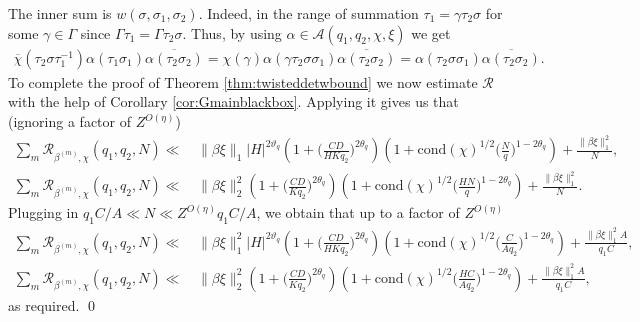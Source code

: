 \documentclass[12pt]{amsart}
\theoremstyle{definition}
\theoremstyle{remark}
\numberwithin{equation}{section}
\newcommand{\1}{{\mathbf 1}}
\begin{document}
The inner sum is $w(\sigma,\sigma_1,\sigma_2)$. Indeed, in the range of summation $  \tau_1 = \gamma \tau_2 \sigma$ for some  $\gamma \in \Gamma$ since $\Gamma \tau_1 = \Gamma \tau_2 \sigma$. Thus, by using $\alpha \in \mathcal{A}(q_1,q_2,\chi,\xi)$ we get
 \begin{align*}
  \overline{\chi}(\tau_2 \sigma \tau_1^{-1}) \alpha(\tau_1  \sigma_1)  \overline{\alpha(\tau_2  \sigma_2)  } =  \chi(\gamma) \alpha( \gamma \tau_2 \sigma  \sigma_1)  \overline{\alpha(\tau_2  \sigma_2)  }  =   \alpha(  \tau_2 \sigma  \sigma_1)  \overline{\alpha(\tau_2  \sigma_2)  }.
 \end{align*}
To complete the proof of Theorem \ref{thm:twisteddetwbound} we now estimate $\mathcal{R}$ with the help of Corollary \ref{cor:Gmainblackbox}. Applying it gives us that  (ignoring  a factor of $ Z^{O(\eta)}$)
\begin{align*}
\sum_m \mathcal{R}_{\beta^{(m)},\chi}(q_1,q_2,N) \ll & \,  \|\beta \xi \|_1|H|^{2\vartheta_q}  \left(1+\bigg(\frac{CD}{ HK q_2 }\bigg)^{2\theta_q} \right)\left(1+ \mathrm{cond}(\chi)^{1/2}\bigg(\frac{N}{q}\bigg)^{1-2\theta_q}\right) + \frac{\|\beta \xi \|_1^2}{ N} ,  \\
   \sum_m \mathcal{R}_{\beta^{(m)},\chi}(q_1,q_2,N) \ll & \,   \|\beta \xi \|_2^2 \left(1+\bigg(\frac{ CD}{ K q_2}\bigg)^{2\theta_q} \right)\left(1+ \mathrm{cond}(\chi)^{1/2}\bigg(\frac{H N}{q}\bigg)^{1-2\theta_q}\right)   +\frac{\|\beta \xi \|_1^2}{ N}.
\end{align*}
Plugging in  $ q_1 C/A \ll N \ll Z^{O(\eta)} q_1 C/A$, we obtain that up to  a factor of $ Z^{O(\eta)}$
\begin{align*}
\sum_m \mathcal{R}_{\beta^{(m)},\chi}(q_1,q_2,N) \ll & \,  \|\beta  \xi \|_1^2|H|^{2\vartheta_q}  \left(1+\bigg(\frac{CD}{ HK q_2 }\bigg)^{2\theta_q} \right)\left(1+ \mathrm{cond}(\chi)^{1/2}\bigg(\frac{C}{A q_2}\bigg)^{1-2\theta_q}\right)  +\frac{ \|\beta  \xi \|_1^2 A }{q_1 C}, \\
   \sum_m \mathcal{R}_{\beta^{(m)},\chi}(q_1,q_2,N)  \ll & \,   \|\beta  \xi  \|_2^2 \left(1+\bigg(\frac{ CD}{ K q_2}\bigg)^{2\theta_q} \right)\left(1+ \mathrm{cond}(\chi)^{1/2}\bigg(\frac{H C}{A q_2 }\bigg)^{1-2\theta_q}\right)   +\frac{ \|\beta  \xi \|_1^2 A }{q_1 C},
\end{align*}
as required.
\qed
\end{document}
